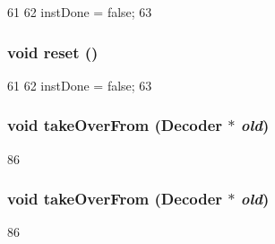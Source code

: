 \begin{DoxyCode}
61     {
62         instDone = false;
63     }
\end{DoxyCode}
\hypertarget{classMipsISA_1_1Decoder_ad20897c5c8bd47f5d4005989bead0e55}{
\subsubsection[{reset}]{\setlength{\rightskip}{0pt plus 5cm}void reset ()}}
\label{classMipsISA_1_1Decoder_ad20897c5c8bd47f5d4005989bead0e55}



\begin{DoxyCode}
61     {
62         instDone = false;
63     }
\end{DoxyCode}
\hypertarget{classMipsISA_1_1Decoder_a83393f90e7cbd98eda9721ba6022d0e0}{
\subsubsection[{takeOverFrom}]{\setlength{\rightskip}{0pt plus 5cm}void takeOverFrom ({\bf Decoder} $\ast$ {\em old})}}
\label{classMipsISA_1_1Decoder_a83393f90e7cbd98eda9721ba6022d0e0}



\begin{DoxyCode}
86 {}
\end{DoxyCode}
\hypertarget{classMipsISA_1_1Decoder_a83393f90e7cbd98eda9721ba6022d0e0}{
\subsubsection[{takeOverFrom}]{\setlength{\rightskip}{0pt plus 5cm}void takeOverFrom ({\bf Decoder} $\ast$ {\em old})}}
\label{classMipsISA_1_1Decoder_a83393f90e7cbd98eda9721ba6022d0e0}



\begin{DoxyCode}
86 {}
\end{DoxyCode}


